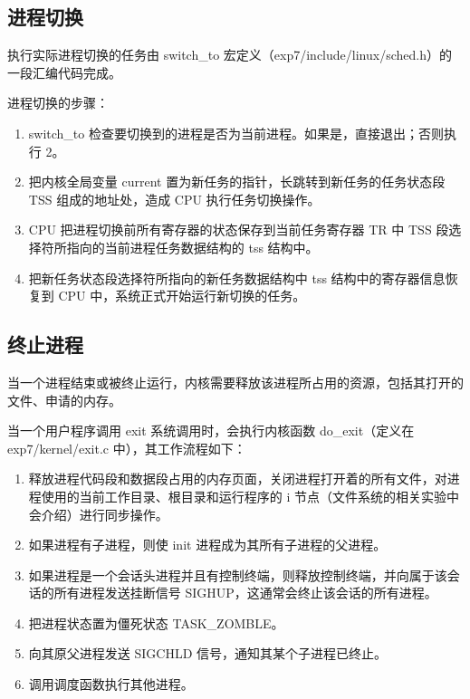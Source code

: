 \subsection{进程切换}

执行实际进程切换的任务由 switch\_to 宏定义（exp7/include/linux/sched.h）的一段汇编代码完成。

进程切换的步骤：

\begin{enumerate}
    \item switch\_to 检查要切换到的进程是否为当前进程。如果是，直接退出；否则执行 2。
    \item 把内核全局变量 current 置为新任务的指针，长跳转到新任务的任务状态段 TSS 组成的地址处，造成 CPU 执行任务切换操作。
    \item CPU 把进程切换前所有寄存器的状态保存到当前任务寄存器 TR 中 TSS 段选择符所指向的当前进程任务数据结构的 tss 结构中。
    \item 把新任务状态段选择符所指向的新任务数据结构中 tss 结构中的寄存器信息恢复到 CPU 中，系统正式开始运行新切换的任务。
\end{enumerate}

\subsection{终止进程}

当一个进程结束或被终止运行，内核需要释放该进程所占用的资源，包括其打开的文件、申请的内存。

当一个用户程序调用 exit 系统调用时，会执行内核函数 do\_exit（定义在 exp7/kernel/exit.c 中），其工作流程如下：

\begin{enumerate}
    \item 释放进程代码段和数据段占用的内存页面，关闭进程打开着的所有文件，对进程使用的当前工作目录、根目录和运行程序的 i 节点（文件系统的相关实验中会介绍）进行同步操作。
    \item 如果进程有子进程，则使 init 进程成为其所有子进程的父进程。
    \item 如果进程是一个会话头进程并且有控制终端，则释放控制终端，并向属于该会话的所有进程发送挂断信号 SIGHUP，这通常会终止该会话的所有进程。
    \item 把进程状态置为僵死状态 TASK\_ZOMBLE。
    \item 向其原父进程发送 SIGCHLD 信号，通知其某个子进程已终止。
    \item 调用调度函数执行其他进程。
\end{enumerate}

